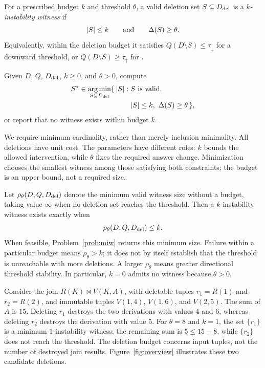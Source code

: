 \begin{definition}
\label{def:witness}
For a prescribed budget $k$ and threshold $\theta$, a valid deletion set
$S\subseteq D_{\mathrm{del}}$ is a \emph{$k$-instability witness} if
\[
|S|\le k\qquad\text{and}\qquad\Delta(S)\ge\theta.
\]
Equivalently, within the deletion budget it satisfies
$Q(D\setminus S)\le\tau_{\downarrow}$ for a downward threshold, or
$Q(D\setminus S)\ge\tau_{\uparrow}$ for .
\end{definition}

\begin{problem}
\label{prob:miw}
Given $D$, $Q$, $D_{\mathrm{del}}$, $k\ge0$, and $\theta>0$, compute
\begin{equation}
\label{eq:miw}
\begin{aligned}
S^\star\in\operatorname*{arg\,min}_{S\subseteq D_{\mathrm{del}}}\{\,|S|:\;&S\text{ is valid},\\
&|S|\le k,\ \Delta(S)\ge\theta\,\},
\end{aligned}
\end{equation}
or report that no witness exists within budget $k$.
\end{problem}

We require minimum cardinality, rather than merely inclusion minimality.
All deletions have unit cost. The parameters have different roles: $k$
bounds the allowed intervention, while $\theta$ fixes the required answer
change. Minimization chooses the smallest witness among those satisfying
both constraints; the budget is an upper bound, not a required size.

Let $\rho_\theta(D,Q,D_{\mathrm{del}})$ denote the minimum valid witness size without
a budget, taking value $\infty$ when no deletion set reaches the threshold.
Then a $k$-instability witness exists exactly when
\[
\rho_\theta(D,Q,D_{\mathrm{del}})\le k.
\]
When feasible, Problem~\ref{prob:miw} returns this minimum size. Failure
within a particular budget means $\rho_\theta>k$; it does not by itself
establish that the threshold is unreachable with more deletions. A larger
$\rho_\theta$ means greater directional threshold stability. In particular,
$k=0$ admits no witness because $\theta>0$.

\begin{example}
\label{ex:miw}
Consider the join $R(K)\Join V(K,A)$, with deletable tuples
$r_1=R(1)$ and $r_2=R(2)$, and immutable tuples
$V(1,4)$, $V(1,6)$, and $V(2,5)$. The sum of $A$ is $15$.
Deleting $r_1$ destroys the two derivations with values $4$ and $6$,
whereas deleting $r_2$ destroys the derivation with value $5$.
For $\theta=8$ and $k=1$, the set $\{r_1\}$ is a minimum
$1$-instability witness:
the remaining sum is $5\le15-8$, while $\{r_2\}$ does not reach the
threshold. The deletion budget concerns input tuples, not the number of
destroyed join results. Figure~\ref{fig:overview} illustrates these
two candidate deletions.
\end{example}

